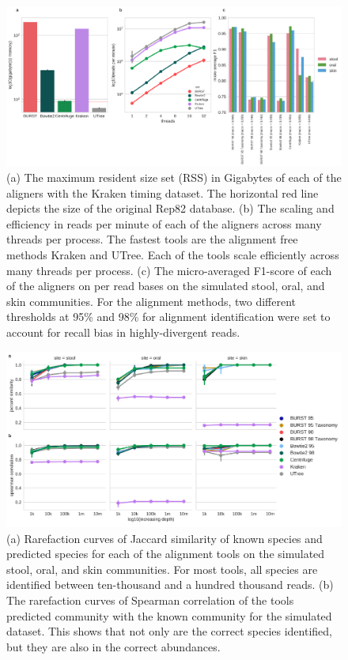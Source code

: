 \begin{figure}[hbt]
    \centering
    \includegraphics[width=0.8\linewidth]{fig/simulations.png}
    \caption{
        (a) The maximum resident size set (RSS) in Gigabytes of each of the aligners with the Kraken timing dataset. The horizontal red line depicts the size of the original Rep82 database. (b) The scaling and efficiency in reads per minute of each of the aligners across many threads per process. The fastest tools are the alignment free methods Kraken and UTree. Each of the tools scale efficiently across many threads per process. (c) The micro-averaged F1-score of each of the aligners on per read bases on the simulated stool, oral, and skin communities. For the alignment methods, two different thresholds at 95\% and 98\% for alignment identification were set to account for recall bias in highly-divergent reads.
    }
    \label{fig:simulations}
\end{figure}

\begin{figure}[hbt]
    \centering
    \includegraphics[width=0.8\linewidth]{fig/simulations_js.pdf}
    \caption{
          (a) Rarefaction curves of Jaccard similarity of known species and predicted species for each of the alignment tools on the simulated stool, oral, and skin communities. For most tools, all species are identified between ten-thousand and a hundred thousand reads. (b) The rarefaction curves of Spearman correlation of the tools predicted community with the known community for the simulated dataset. This shows that not only are the correct species identified, but they are also in the correct abundances. 
    }
    \label{fig:simulations_js}
\end{figure}


